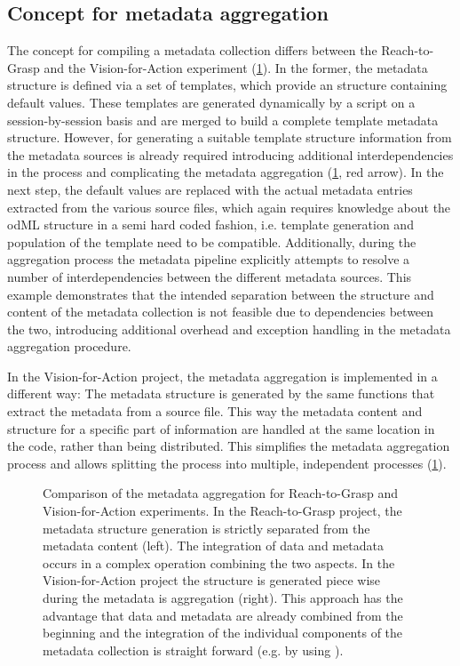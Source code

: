 \subsection{Concept for metadata aggregation}
\label{sec:disscussion_metadata_concept}
The concept for compiling a metadata collection differs between the Reach-to-Grasp and the Vision-for-Action experiment (\cref{fig:discussion_comparison_r2g_v4a}). In the former, the metadata structure is defined via a set of templates, which provide an  structure containing default values. These templates are generated dynamically by a script on a session-by-session basis and are merged to build a complete template metadata structure. However, for generating a suitable template structure information from the metadata sources is already required introducing additional interdependencies in the process and complicating the metadata aggregation (\cref{fig:discussion_comparison_r2g_v4a}, red arrow). In the next step, the default values are replaced with the actual metadata entries extracted from the various source files, which again requires knowledge about the odML structure in a semi hard coded fashion, i.e. template generation and population of the template need to be compatible. Additionally, during the aggregation process the metadata pipeline explicitly attempts to resolve a number of interdependencies between the different metadata sources. This example demonstrates that the intended separation between the structure and content of the metadata collection is not feasible due to dependencies between the two, introducing additional overhead and exception handling in the metadata aggregation procedure.


In the Vision-for-Action project, the metadata aggregation is implemented in a different way: The metadata structure is generated by the same functions that extract the metadata from a source file. This way the metadata content and structure for a specific part of information are handled at the same location in the code, rather than being distributed. This simplifies the metadata aggregation process and allows splitting the process into multiple, independent processes (\cref{fig:discussion_comparison_r2g_v4a}).

\begin{figure}
 \centering
 
 \caption[Comparison of the metadata aggregation for Reach-to-Grasp and Vision-for-Action experiments]{Comparison of the metadata aggregation for Reach-to-Grasp and Vision-for-Action experiments. In the Reach-to-Grasp project, the metadata structure generation is strictly separated from the metadata content (left). The integration of data and metadata occurs in a complex operation combining the two aspects. In the Vision-for-Action project the structure is generated  piece wise during the metadata is aggregation (right). This approach has the advantage that data and metadata are already combined from the beginning and the integration of the individual components of the metadata collection is straight forward (e.g. by using ).}
 \label{fig:discussion_comparison_r2g_v4a}
\end{figure}

